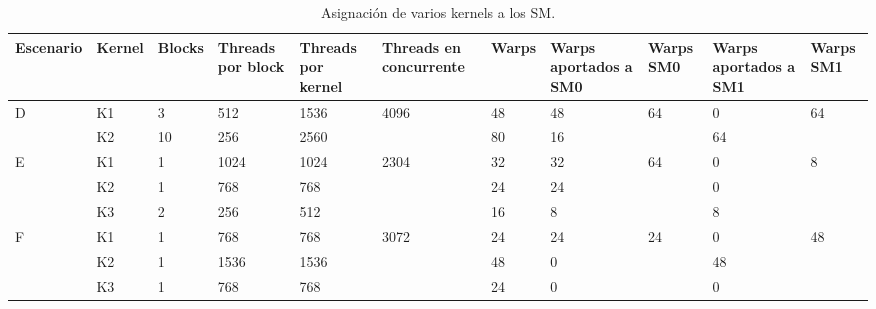     \begin{table}[h!]
      \begin{center}
            \scriptsize
        \begin{tabular}{|m{1.5cm}|m{1cm}|m{1cm}|m{1cm}|m{1cm}|m{1cm}|m{1cm}|m{1cm}|m{1cm}|m{1cm}|m{1cm}|}
         \hline
         \cellcolor{lightgray}\textbf{Escenario} & 
         \cellcolor{lightgray}\textbf{Kernel} & 
         \cellcolor{lightgray}\textbf{Blocks} &
         \cellcolor{lightgray}\textbf{Threads por block} &
         \cellcolor{lightgray}\textbf{Threads por kernel} &
         \cellcolor{lightgray}\textbf{Threads en concurrente} &
         \cellcolor{lightgray}\textbf{Warps} &
         \cellcolor{lightgray}\textbf{Warps aportados a SM0} &
         \cellcolor{lightgray}\textbf{Warps SM0} &
         \cellcolor{lightgray}\textbf{Warps aportados a SM1} &
         \cellcolor{lightgray}\textbf{Warps SM1} \\ 
         \hline
         \multirow{2}{1cm}{D} & K1 & 3  & 512 & 1536 & \multirow{2}{1cm}{4096} & 48 & 48 & \multirow{2}{1cm}{64} & 0  & \multirow{2}{1cm}{64}\\ 
                              & K2 & 10 & 256 & 2560 &                         & 80 & 16 &                       & 64 & \\ 
         \hline \hline
        \multirow{3}{1cm}{E} & K1 & 1 & 1024 & 1024 & \multirow{3}{1cm}{2304} & 32 & 32 & \multirow{3}{1cm}{64} & 0  & \multirow{3}{1cm}{8}\\ 
                             & K2 & 1 & 768  & 768  &                         & 24 & 24 &                      & 0 & \\ 
                             & K3 & 2 & 256  & 512  &                         & 16 & 8 &                       & 8 & \\ 
         \hline \hline
        \multirow{3}{1cm}{F} & K1 & 1 & 768  & 768  & \multirow{3}{1cm}{3072} & 24 & 24 & \multirow{3}{1cm}{24} & 0  & \multirow{3}{1cm}{48}\\ 
                             & K2 & 1 & 1536 & 1536 &                         & 48 & 0  &                       & 48 & \\ 
                             & K3 & 1 & 768  & 768  &                         & 24 & 0  &                       & 0 & \\ 
         \hline
           \end{tabular}
        \caption{Asignación de varios kernels a los SM.}
        \label{tab:asigVariosKernelsSM}
      \end{center}
    \end{table}
    
